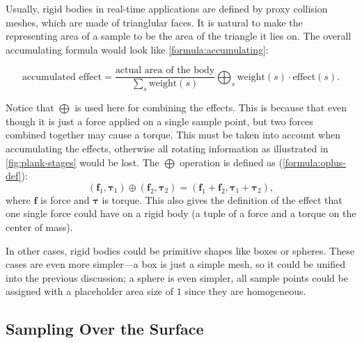 \documentclass{article}
\begin{document}
Usually, rigid bodies in real-time applications are defined by proxy collision meshes, which are made of trianglular faces.
It is natural to make the representing area of a sample to be the area of the triangle it lies on.
The overall accumulating formula would look like \ref{formula:accumulating}:

\begin{equation}
	\text{accumulated effect}
	=
	\frac{\text{actual area of the body}}{\sum_{s}\text{weight}(s)}
	\bigoplus_{s}\text{weight}(s)\cdot\text{effect}(s)
	.
	\label{formula:accumulating}
\end{equation}

Notice that $\bigoplus$ is used here for combining the effects.
This is because that even though it is just a force applied on a single sample point, but two forces combined together may cause a torque.
This must be taken into account when accumulating the effects, otherwise all rotating information as illustrated in \ref{fig:plank-stages} would be lost.
The $\bigoplus$ operation is defined as (\ref{formula:oplus-def}):
\begin{equation}
	(\mathbf{f}_1,\mathbf{\tau}_1)
	\oplus
	(\mathbf{f}_2,\mathbf{\tau}_2)
	=
	(\mathbf{f}_1+\mathbf{f}_2,\mathbf{\tau}_1+\mathbf{\tau}_2),
	\label{formula:oplus-def}
\end{equation}
where $\mathbf{f}$ is force and $\mathbf{\tau}$ is torque.
This also gives the definition of the effect that one single force could have
 on a rigid body (a tuple of a force and a torque on the center of mass).

In other cases, rigid bodies could be primitive shapes like boxes or spheres.
These cases are even more simpler---a box is just a simple mesh, so it could be unified into the previous discussion; a sphere is even simpler, all sample points could be assigned with a placeholder area size of $1$ since they are homogeneous.

\subsection*{Sampling Over the Surface}
\end{document}
